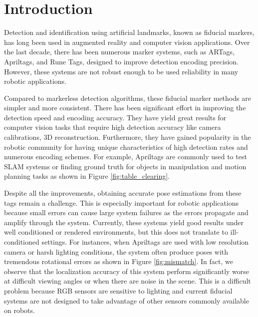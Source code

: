 \section{Introduction}
\label{sec:intro}
Detection and identification using artificial landmarks, known as fiducial markers, has long been used in augmented reality and computer vision applications. Over the last decade, there has been numerous marker systems, such as ARTags, Apriltags, and Rune Tags, designed to improve detection encoding precision. However, these systems are not robust enough to be used reliability in many robotic applications.

Compared to markerless detection algorithms, these fiducial marker methods are simpler and more consistent. There has been significant effort in improving the detection speed and encoding accuracy. They have yield great results for computer vision tasks that require high detection accuracy like camera calibrations, 3D reconstruction. Furthermore, they have gained popularity in the robotic community for having unique characteristics of high detection rates and numerous encoding schemes. For example, Apriltags are commonly used to test SLAM systems or finding ground truth for objects in manipulation and motion planning tasks as shown in Figure \ref{fig:table_clearing}. 

Despite all the improvements, obtaining accurate pose estimations from these tags remain a challenge. This is especially important for robotic applications because small errors can cause large system failures as the errors propagate and amplify through the system. Currently, these systems yield good results under well conditioned or rendered environments, but this does not translate to ill-conditioned settings. For instances, when Apriltags are used with low resolution camera or harsh lighting conditions, the system often produce poses with tremendous rotational errors as shown in Figure \ref{fig:mismatch}. In fact, we observe that the localization accuracy of this system perform significantly worse at difficult viewing angles or when there are noise in the scene. This is a difficult problem because RGB sensors are sensitive to lighting and current fiducial systems are not designed to take advantage of other sensors commonly available on robots.

